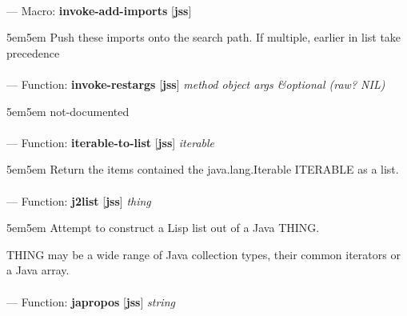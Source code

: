 \paragraph{}
\label{JSS:INVOKE-ADD-IMPORTS}
--- Macro: \textbf{invoke-add-imports} [\textbf{jss}] \textit{}

\begin{adjustwidth}{5em}{5em}
Push these imports onto the search path. If multiple, earlier in list take precedence
\end{adjustwidth}

\paragraph{}
\label{JSS:INVOKE-RESTARGS}
--- Function: \textbf{invoke-restargs} [\textbf{jss}] \textit{method object args \&optional (raw? NIL)}

\begin{adjustwidth}{5em}{5em}
not-documented
\end{adjustwidth}

\paragraph{}
\label{JSS:ITERABLE-TO-LIST}
--- Function: \textbf{iterable-to-list} [\textbf{jss}] \textit{iterable}

\begin{adjustwidth}{5em}{5em}
Return the items contained the java.lang.Iterable ITERABLE as a list.
\end{adjustwidth}

\paragraph{}
\label{JSS:J2LIST}
--- Function: \textbf{j2list} [\textbf{jss}] \textit{thing}

\begin{adjustwidth}{5em}{5em}
Attempt to construct a Lisp list out of a Java THING.

THING may be a wide range of Java collection types, their common
iterators or a Java array.
\end{adjustwidth}

\paragraph{}
\label{JSS:JAPROPOS}
--- Function: \textbf{japropos} [\textbf{jss}] \textit{string}

